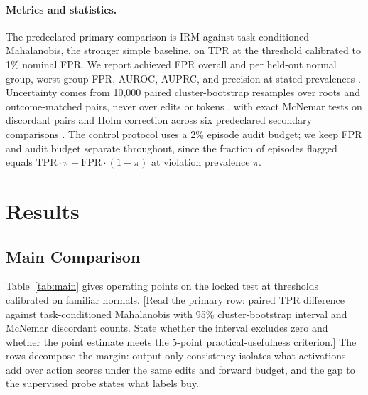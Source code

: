 \documentclass[10pt]{article}
\newcommand{\TBD}[1]{\textcolor{BrickRed}{[#1]}}
\newcommand{\method}{\textsc{IRM}}
\begin{document}
\paragraph{Metrics and statistics.}
The predeclared primary comparison is \method{} against task-conditioned Mahalanobis, the stronger
simple baseline, on TPR at the threshold calibrated to 1\% nominal FPR. We report achieved FPR overall
and per held-out normal group, worst-group FPR, AUROC, AUPRC, and precision at stated prevalences
\citep{saito2015precision}. Uncertainty comes from 10{,}000 paired cluster-bootstrap resamples over
roots and outcome-matched pairs, never over edits or tokens \citep{miller2024errorbars}, with exact
McNemar tests on discordant pairs \citep{mcnemar1947note} and Holm correction across six predeclared
secondary comparisons \citep{holm1979simple}. The control protocol uses a 2\% episode audit budget;
we keep FPR and audit budget separate throughout, since the fraction of episodes flagged equals
$\mathrm{TPR}\cdot\pi+\mathrm{FPR}\cdot(1-\pi)$ at violation prevalence $\pi$.

\section{Results}
\label{sec:results}

\noindent{}

\subsection{Main Comparison}
\label{sec:main}

Table~\ref{tab:main} gives operating points on the locked test at thresholds calibrated on familiar
normals. \TBD{Read the primary row: paired TPR difference against task-conditioned Mahalanobis with
95\% cluster-bootstrap interval and McNemar discordant counts. State whether the interval excludes
zero and whether the point estimate meets the 5-point practical-usefulness criterion.} The rows
decompose the margin: output-only consistency isolates what activations add over action scores under
the same edits and forward budget, and the gap to the supervised probe states what labels buy.
\end{document}
